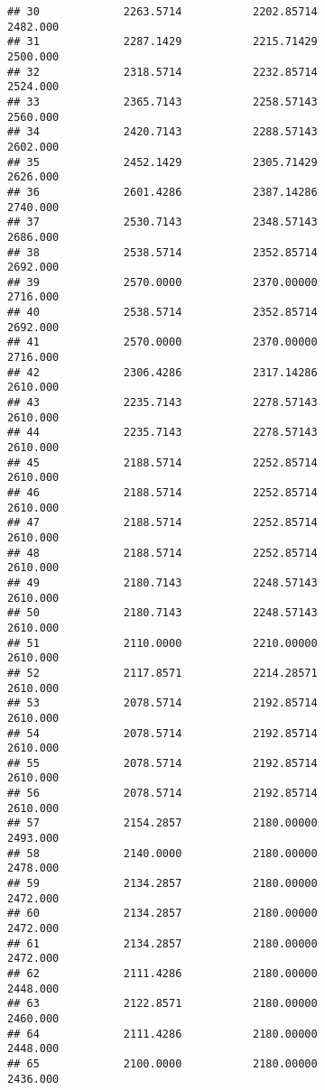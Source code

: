 \documentclass[]{article}
\begin{document}
\begin{verbatim}
## 30             2263.5714           2202.85714                2482.000
## 31             2287.1429           2215.71429                2500.000
## 32             2318.5714           2232.85714                2524.000
## 33             2365.7143           2258.57143                2560.000
## 34             2420.7143           2288.57143                2602.000
## 35             2452.1429           2305.71429                2626.000
## 36             2601.4286           2387.14286                2740.000
## 37             2530.7143           2348.57143                2686.000
## 38             2538.5714           2352.85714                2692.000
## 39             2570.0000           2370.00000                2716.000
## 40             2538.5714           2352.85714                2692.000
## 41             2570.0000           2370.00000                2716.000
## 42             2306.4286           2317.14286                2610.000
## 43             2235.7143           2278.57143                2610.000
## 44             2235.7143           2278.57143                2610.000
## 45             2188.5714           2252.85714                2610.000
## 46             2188.5714           2252.85714                2610.000
## 47             2188.5714           2252.85714                2610.000
## 48             2188.5714           2252.85714                2610.000
## 49             2180.7143           2248.57143                2610.000
## 50             2180.7143           2248.57143                2610.000
## 51             2110.0000           2210.00000                2610.000
## 52             2117.8571           2214.28571                2610.000
## 53             2078.5714           2192.85714                2610.000
## 54             2078.5714           2192.85714                2610.000
## 55             2078.5714           2192.85714                2610.000
## 56             2078.5714           2192.85714                2610.000
## 57             2154.2857           2180.00000                2493.000
## 58             2140.0000           2180.00000                2478.000
## 59             2134.2857           2180.00000                2472.000
## 60             2134.2857           2180.00000                2472.000
## 61             2134.2857           2180.00000                2472.000
## 62             2111.4286           2180.00000                2448.000
## 63             2122.8571           2180.00000                2460.000
## 64             2111.4286           2180.00000                2448.000
## 65             2100.0000           2180.00000                2436.000

\end{verbatim}
\end{document}
